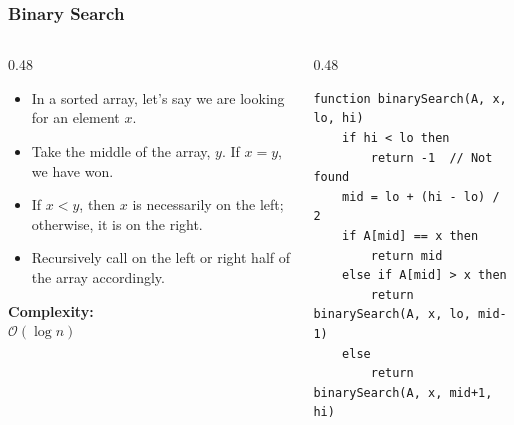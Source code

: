 \documentclass[8pt,aspectratio=169]{beamer}
\begin{document}
\begin{frame}[fragile]
\frametitle{Binary Search}

\begin{columns}[T]

    \begin{column}{0.48\textwidth}
        \begin{itemize}
            \item In a sorted array, let's say we are looking for an element $x$.
            \item Take the middle of the array, $y$. If $x=y$, we have won.
            \item If $x < y$, then $x$ is necessarily on the left; otherwise, it is on the right.
            \item Recursively call on the left or right half of the array accordingly.
        \end{itemize}
        
        \vspace{1em}
        \textbf{Complexity:} \\
        $\mathcal{O}(\log n)$
    \end{column}

    \begin{column}{0.48\textwidth}
    \begin{lstlisting}[basicstyle=\tiny\ttfamily, frame=single]
function binarySearch(A, x, lo, hi)
    if hi < lo then
        return -1  // Not found
    mid = lo + (hi - lo) / 2
    if A[mid] == x then
        return mid
    else if A[mid] > x then
        return binarySearch(A, x, lo, mid-1)
    else
        return binarySearch(A, x, mid+1, hi)
    \end{lstlisting}
    \end{column}
\end{columns}
\end{frame}
\end{document}
